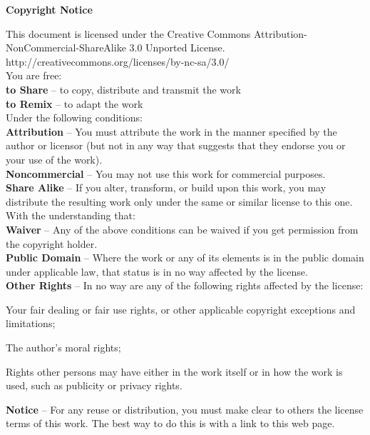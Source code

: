 \begin{center}
\large\textbf{Copyright Notice}
\end{center}

\small
\noindent
This document is licensed under the Creative Commons Attribution-NonCommercial-ShareAlike 3.0 Unported License. http://creativecommons.org/licenses/by-nc-sa/3.0/
\\[0.3cm]
You are free:
\\
\textbf{to Share} -- to copy, distribute and transmit the work
\\
\textbf{to Remix} -- to adapt the work
\\[0.3cm]
Under the following conditions:
\\
\textbf{Attribution} -- You must attribute the work in the manner specified by the author or licensor (but not in any way that suggests that they endorse you or your use of the work).
\\
\textbf{Noncommercial} -- You may not use this work for commercial purposes.
\\
\textbf{Share Alike} -- If you alter, transform, or build upon this work, you may distribute the resulting work only under the same or similar license to this one.
\\[0.3cm]
With the understanding that:
\\
\textbf{Waiver} -- Any of the above conditions can be waived if you get permission from the copyright holder.
\\
\textbf{Public Domain} -- Where the work or any of its elements is in the public domain under applicable law, that status is in no way affected by the license.
\\
\textbf{Other Rights} -- In no way are any of the following rights affected by the license:
\begin{itemize*}
	\item Your fair dealing or fair use rights, or other applicable copyright exceptions and limitations;
	\item The author's moral rights;
	\item Rights other persons may have either in the work itself or in how the work is used, such as publicity or privacy rights.
\end{itemize*}
\textbf{Notice} -- For any reuse or distribution, you must make clear to others the license terms of this work. The best way to do this is with a link to this web page.